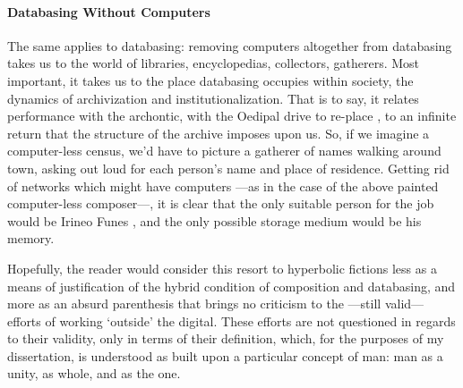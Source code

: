 \paragraph{Databasing Without Computers}
The same applies to databasing: removing computers altogether from databasing takes us to the world of libraries, encyclopedias, collectors, gatherers. Most important, it takes us to the place databasing occupies within society, the dynamics of archivization and institutionalization. That is to say, it relates performance with the archontic, with the Oedipal drive to re-place , to an infinite return that the structure of the archive imposes upon us. So, if we imagine a computer-less census, we'd have to picture a gatherer of names walking around town, asking out loud for each person's name and place of residence. Getting rid of networks which might have computers ---as in the case of the above painted computer-less composer---, it is clear that the only suitable person for the job would be Irineo Funes , and the only possible storage medium would be his memory. 

Hopefully, the reader would consider this resort to hyperbolic fictions less as a means of justification of the hybrid condition of composition and databasing, and more as an absurd parenthesis that brings no criticism to the ---still valid--- efforts of working `outside' the digital. These efforts are not questioned in regards to their validity, only in terms of their definition, which, for the purposes of my dissertation, is understood as built upon a particular concept of man: man as a unity, as whole, and as the one.